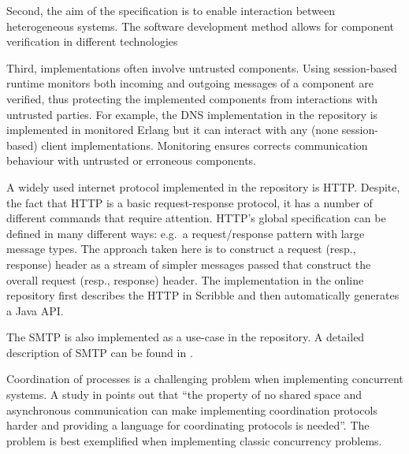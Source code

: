 Second, the aim of the specification is to enable
interaction between heterogeneous systems.
The software development method allows for component
verification in different technologies

Third, implementations often involve untrusted components.
Using session-based runtime monitors both incoming and outgoing
messages of a component are verified, thus protecting the
implemented components from interactions with untrusted parties.
For example, the DNS implementation in the repository
is implemented in monitored Erlang but it can interact with any
(none session-based) client implementations. Monitoring ensures
corrects communication behaviour with untrusted or erroneous
components.

A widely used internet protocol implemented in the repository is HTTP.
Despite, the fact that HTTP is a basic request-response protocol,
it has a number of different commands that require attention.
HTTP's global specification can be defined in many different ways:
e.g.~a request/response pattern with large message types. The approach
taken here is to construct a request (resp., response) header as
a stream of simpler messages passed that construct the overall
request (resp., response) header. The implementation in the online
repository first describes the HTTP in Scribble and then automatically
generates a Java API.

The SMTP is also implemented as a use-case in the repository.
A detailed description of SMTP can be found in .







Coordination of processes is a challenging problem
when implementing concurrent systems.
A study in \cite{ActorCoordinationStudy} points out that
``the property of no shared space and asynchronous communication
can make implementing coordination protocols harder and
providing a language for coordinating protocols is needed''.
The problem is best exemplified when implementing
classic concurrency problems.

